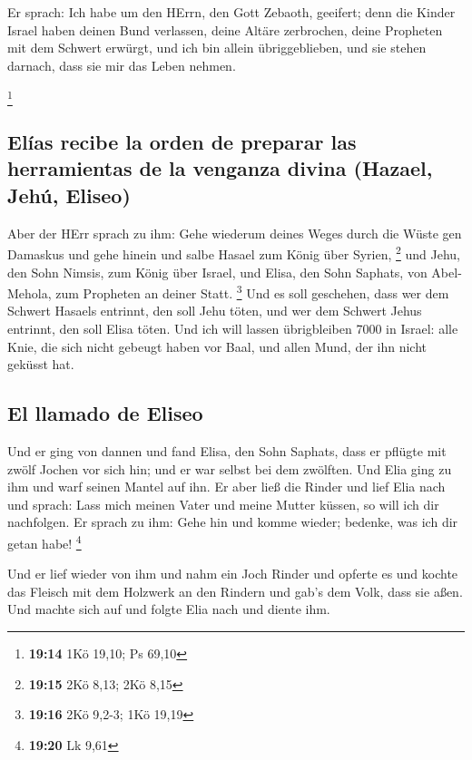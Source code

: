  Er sprach: Ich habe um den HErrn, den Gott Zebaoth,
geeifert; denn die Kinder Israel haben deinen Bund verlassen, deine
Altäre zerbrochen, deine Propheten mit dem Schwert erwürgt, und ich bin
allein übriggeblieben, und sie stehen darnach, dass sie mir das Leben
nehmen.

\footnote{\textbf{19:14} 1Kö 19,10; Ps 69,10}

\hypertarget{eluxedas-recibe-la-orden-de-preparar-las-herramientas-de-la-venganza-divina-hazael-jehuxfa-eliseo}{%
\subsection{Elías recibe la orden de preparar las herramientas de la
venganza divina (Hazael, Jehú,
Eliseo)}\label{eluxedas-recibe-la-orden-de-preparar-las-herramientas-de-la-venganza-divina-hazael-jehuxfa-eliseo}}

 Aber der HErr sprach zu ihm: Gehe wiederum deines Weges
durch die Wüste gen Damaskus und gehe hinein und salbe Hasael zum König
über Syrien, \footnote{\textbf{19:15} 2Kö 8,13; 2Kö 8,15}
 und Jehu, den Sohn Nimsis, zum König über Israel, und
Elisa, den Sohn Saphats, von Abel-Mehola, zum Propheten an deiner Statt.
\footnote{\textbf{19:16} 2Kö 9,2-3; 1Kö 19,19}  Und es
soll geschehen, dass wer dem Schwert Hasaels entrinnt, den soll Jehu
töten, und wer dem Schwert Jehus entrinnt, den soll Elisa töten.
 Und ich will lassen übrigbleiben 7000 in Israel: alle
Knie, die sich nicht gebeugt haben vor Baal, und allen Mund, der ihn
nicht geküsst hat.

\hypertarget{el-llamado-de-eliseo}{%
\subsection{El llamado de Eliseo}\label{el-llamado-de-eliseo}}

 Und er ging von dannen und fand Elisa, den Sohn Saphats,
dass er pflügte mit zwölf Jochen vor sich hin; und er war selbst bei dem
zwölften. Und Elia ging zu ihm und warf seinen Mantel auf ihn.
 Er aber ließ die Rinder und lief Elia nach und sprach:
Lass mich meinen Vater und meine Mutter küssen, so will ich dir
nachfolgen. Er sprach zu ihm: Gehe hin und komme wieder; bedenke, was
ich dir getan habe! \footnote{\textbf{19:20} Lk 9,61}

 Und er lief wieder von ihm und nahm ein Joch Rinder und
opferte es und kochte das Fleisch mit dem Holzwerk an den Rindern und
gab's dem Volk, dass sie aßen. Und machte sich auf und folgte Elia nach
und diente ihm.


